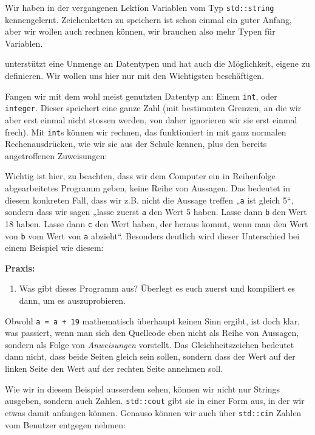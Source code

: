 
Wir haben in der vergangenen Lektion Variablen vom Typ \texttt{std::string}
kennengelernt. Zeichenketten zu speichern ist schon einmal ein guter Anfang,
aber wir wollen auch rechnen können, wir brauchen also mehr Typen für
Variablen.

\Cpp unterstützt eine Unmenge an Datentypen und hat auch die Möglichkeit,
eigene zu definieren. Wir wollen uns hier nur mit den Wichtigsten beschäftigen.

Fangen wir mit dem wohl meist genutzten Datentyp an: Einem \texttt{int}, oder
\texttt{integer}. Dieser speichert eine ganze Zahl (mit bestimmten Grenzen, an
die wir aber erst einmal nicht stossen werden, von daher ignorieren wir sie
erst einmal frech). Mit \texttt{int}s können wir rechnen, das funktioniert in
\Cpp mit ganz normalen Rechenausdrücken, wie wir sie aus der Schule kennen,
plus den bereits angetroffenen Zuweisungen:


Wichtig ist hier, zu beachten, dass wir dem Computer ein in Reihenfolge
abgearbeitetes Programm geben, keine Reihe von Aussagen. Das bedeutet in diesem
konkreten Fall, dass wir z.B. nicht die Aussage treffen „\texttt{a} ist gleich
5“, sondern dass wir sagen „lasse zuerst \texttt{a} den Wert 5 haben. Lasse
dann \texttt{b} den Wert 18 haben. Lasse dann \texttt{c} den Wert haben, der
heraus kommt, wenn man den Wert von \texttt{b} vom Wert von \texttt{a}
abzieht“. Besonders deutlich wird dieser Unterschied bei einem Beispiel wie
diesem:


\textbf{Praxis:}
\begin{enumerate}
    \item Was gibt dieses Programm aus? Überlegt es euch zuerst und kompiliert
        es dann, um es auszuprobieren.
\end{enumerate}

Obwohl \texttt{a = a + 19} mathematisch überhaupt keinen Sinn ergibt, ist doch
klar, was passiert, wenn man sich den Quellcode eben nicht als Reihe von
Aussagen, sondern als Folge von \emph{Anweisungen} vorstellt. Das
Gleichheitszeichen bedeutet dann nicht, dass beide Seiten gleich sein sollen,
sondern dass der Wert auf der linken Seite den Wert auf der rechten Seite
annehmen soll.

Wie wir in diesem Beispiel ausserdem sehen, können wir nicht nur Strings
ausgeben, sondern auch Zahlen. \texttt{std::cout} gibt sie in einer Form aus,
in der wir etwas damit anfangen können. Genauso können wir auch über
\texttt{std::cin} Zahlen vom Benutzer entgegen nehmen:

